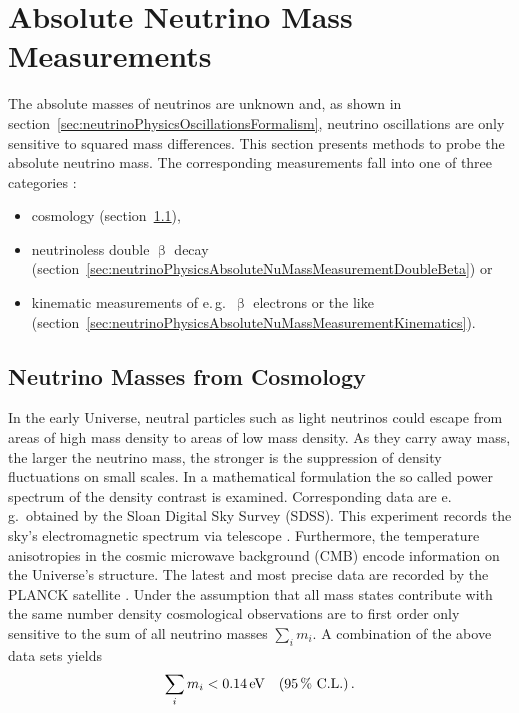 \section{Absolute Neutrino Mass Measurements}
\label{sec:neutrinoPhysicsAbsoluteNuMassMeasurement}
The absolute masses of neutrinos are unknown and, as shown in section~\ref{sec:neutrinoPhysicsOscillationsFormalism}, neutrino oscillations are only sensitive to squared mass differences. This section presents methods to probe the absolute neutrino mass. The corresponding measurements fall into one of three categories \cite{Otten:2008zz}:
\begin{itemize}
    \renewcommand{\labelitemi}{$\bullet$}
    \item cosmology (section~\ref{sec:neutrinoPhysicsAbsoluteNuMassMeasurementCosmo}),
    \item neutrinoless double $\upbeta$ decay (section~\ref{sec:neutrinoPhysicsAbsoluteNuMassMeasurementDoubleBeta}) or
    \item kinematic measurements of e.\,g.~$\upbeta$ electrons or the like (section~\ref{sec:neutrinoPhysicsAbsoluteNuMassMeasurementKinematics}).
\end{itemize}

\subsection{Neutrino Masses from Cosmology}
\label{sec:neutrinoPhysicsAbsoluteNuMassMeasurementCosmo}
In the early Universe, neutral particles such as light neutrinos could escape from areas of high mass density to areas of low mass density. As they carry away mass, the larger the neutrino mass, the stronger is the suppression of density fluctuations on small scales. In a mathematical formulation the so called power spectrum of the density contrast is examined. Corresponding data are e.\,g.~obtained by the Sloan Digital Sky Survey (SDSS). This experiment records the sky's electromagnetic spectrum via telescope \cite{Doroshkevich2004}. Furthermore, the temperature anisotropies in the cosmic microwave background (CMB) encode information on the Universe's structure. The latest and most precise data are recorded by the PLANCK satellite \cite{Aghanim:2018}. Under the assumption that all mass states contribute with the same number density cosmological observations are to first order only sensitive to the sum of all neutrino masses $\sum_{i} m_i$. A combination of the above data sets yields \cite{Yeche:2017upn}
\begin{equation*}
    \sum_i m_i < \SI{0.14}{eV} \quad (\SI{95}{\percent} \text{ C.L.}) \text{\,.}
\end{equation*}
\FloatBarrier

